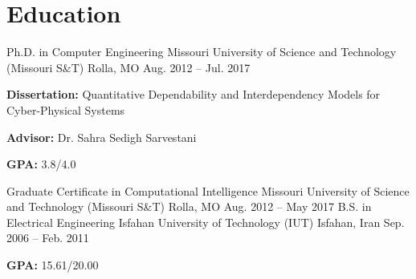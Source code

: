 \section{Education}
\begin{cventries}
  \cventry
    {Ph.D. in Computer Engineering}
    {Missouri University of Science and Technology (Missouri S\&T)}
    {Rolla, MO}
    {Aug. 2012 -- Jul. 2017}
    {
      \begin{cvitems}
        \ifcv
          \item \textbf{Dissertation:} Quantitative Dependability and Interdependency Models for Cyber-Physical Systems
          \item \textbf{Advisor:} Dr. Sahra Sedigh Sarvestani
          \item \textbf{GPA:} 3.8/4.0
        \fi
      \end{cvitems}
    }
  \cventry
    {Graduate Certificate in Computational Intelligence}
    {Missouri University of Science and Technology (Missouri S\&T)}
    {Rolla, MO}
    {Aug. 2012 -- May 2017}
    {}
  \cventry
    {B.S. in Electrical Engineering}
    {Isfahan University of Technology (IUT)}
    {Isfahan, Iran}
    {Sep. 2006 -- Feb. 2011}
    {
      \ifcv
        \begin{cvitems}
          \item \textbf{GPA:} 15.61/20.00
        \end{cvitems}
      \fi
    }
\end{cventries} 